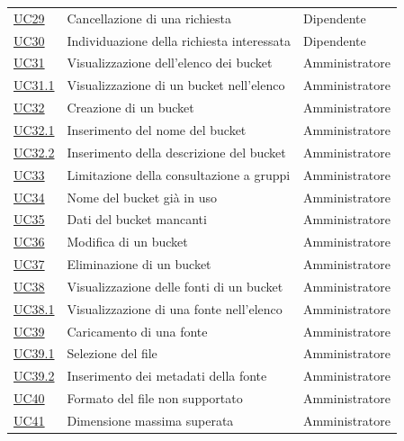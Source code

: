 \documentclass[documento]{gpt}
\begin{document}
{\begin{longtable}{@{}p{1.9cm}>{\raggedright\arraybackslash}p{8.7cm}>{\raggedright\arraybackslash}p{4.2cm}@{}}
\hyperref[uc:annulla_inv]{UC29} & Cancellazione di una richiesta & Dipendente \\
\hyperref[uc:sel_rich]{UC30} & Individuazione della richiesta interessata & Dipendente \\
\hyperref[uc:bk_elenco]{UC31} & Visualizzazione dell'elenco dei bucket & Amministratore \\
\hspace{1em}\hyperref[uc:bk_elem]{UC31.1} & Visualizzazione di un bucket nell'elenco & Amministratore \\
\hyperref[uc:bk_crea]{UC32} & Creazione di un bucket & Amministratore \\
\hspace{1em}\hyperref[uc:bk_nome]{UC32.1} & Inserimento del nome del bucket & Amministratore \\
\hspace{1em}\hyperref[uc:bk_desc]{UC32.2} & Inserimento della descrizione del bucket & Amministratore \\
\hyperref[uc:bk_dest]{UC33} & Limitazione della consultazione a gruppi & Amministratore \\
\hyperref[uc:bk_nome_dup]{UC34} & Nome del bucket già in uso & Amministratore \\
\hyperref[uc:bk_incompleto]{UC35} & Dati del bucket mancanti & Amministratore \\
\hyperref[uc:bk_modifica]{UC36} & Modifica di un bucket & Amministratore \\
\hyperref[uc:bk_elimina]{UC37} & Eliminazione di un bucket & Amministratore \\
\hyperref[uc:fn_elenco]{UC38} & Visualizzazione delle fonti di un bucket & Amministratore \\
\hspace{1em}\hyperref[uc:fn_elem]{UC38.1} & Visualizzazione di una fonte nell'elenco & Amministratore \\
\hyperref[uc:fn_carica]{UC39} & Caricamento di una fonte & Amministratore \\
\hspace{1em}\hyperref[uc:fn_file]{UC39.1} & Selezione del file & Amministratore \\
\hspace{1em}\hyperref[uc:fn_meta]{UC39.2} & Inserimento dei metadati della fonte & Amministratore \\
\hyperref[uc:fn_formato]{UC40} & Formato del file non supportato & Amministratore \\
\hyperref[uc:fn_dim]{UC41} & Dimensione massima superata & Amministratore \\

\end{longtable}}
\end{document}

